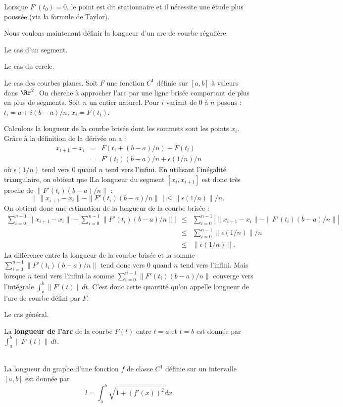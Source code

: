 \documentclass[class=report,crop=false]{standalone}
\begin{document}
Lorsque $F'(t_{0}) = 0$, le point est dit stationnaire et il nécessite une étude plus poussée (via la formule de Taylor).



Nous voulons maintenant définir la longueur d'un arc de courbe réguli\`ere. 

Le cas d'un segment.

Le cas du cercle.

Le cas des courbes planes.
Soit $F$ une fonction $C^1$ définie sur $[a,b]$ \`a valeurs dans $\Rr^2$. On cherche \`a approcher l'arc par une ligne brisée comportant de plus en plus de segments. Soit $n$ un entier naturel. Pour $i$ variant de 0 \`a $n$ posons : $t_i=a+i(b-a)/n$, $x_i=F(t_i)$.


Calculons la longueur de la courbe brisée dont les sommets sont les points $x_i$.
Gr\^ace \`a la définition de la dérivée on a :
\begin{eqnarray*}
x_{i+1}-x_i&=&F(t_i+(b-a)/n)-F(t_i)\\
&=&F'(t_i)(b-a)/n+\epsilon(1/n)/n
\end{eqnarray*}
o\`u $\epsilon(1/n)$ tend vers $0$ quand $n$ tend vers l'infini. En utilisant l'inégalité triangulaire, on obtient que lLa longueur du segment $[x_i,x_{i+1}]$ est donc tr\`es proche de $\|F'(t_i)(b-a)/n\|$ :
$$
\big|~~\|x_{i+1}-x_i\|-\|F'(t_i)(b-a)/n\|~~\big|\leq \|\epsilon(1/n)\|/n.
$$
On obtient donc une estimation de la longueur de la courbe brisée :
\begin{eqnarray*}
\sum_{i=0}^{n-1}\|x_{i+1}-x_i\|-\sum_{i=0}^{n-1}\|F'(t_i)(b-a)/n\||&\leq&\sum_{i=0}^{n-1}|\|x_{i+1}-x_i\|-\|F'(t_i)(b-a)/n\||\\
&\leq&\sum_{i=0}^{n-1} \|\epsilon(1/n)\|/n\\
&\leq&\|\epsilon(1/n)\|.
\end{eqnarray*}
La différence entre la longueur de la courbe brisée et la somme $\sum_{i=0}^{n-1}\|F'(t_i)(b-a)/n\|$ tend donc vers 0 quand $n$ tend vers l'infini.
Mais lorsque $n$ tend vers l'infini la somme $\sum_{i=0}^{n-1}\|F'(t_i)(b-a)/n\|$ converge vers l'intégrale $\int_a^b\|F'(t)\|dt$. C'est donc cette quantité qu'on appelle longueur de l'arc de courbe défini par $F$.

Le cas général.
\begin{definition}
La {\bf longueur de l'arc} de la courbe $F(t)$ entre $t = a$ et $t = b$ est donnée par $\displaystyle \int_{a}^b \|F'(t)\|\, dt$.
\end{definition}

\\
La longueur du graphe d'une fonction $f$ de classe $C^1$ définie sur un intervalle $[a,b]$ est donnée par
$$l=\int_a^b \sqrt{1+(f'(x))^2}dx$$
\end{document}
